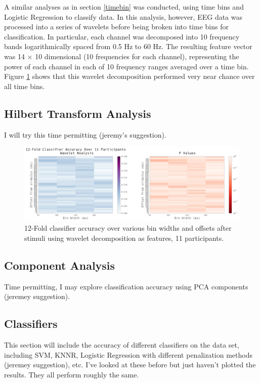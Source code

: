 \documentclass[11pt]{report}
\begin{document}
A similar analyses as in section \ref{timebin} was conducted, using time bins and Logistic Regression to classify data.  In this analysis, however, EEG data was processed into a series of wavelets before being broken into time bins for classification.  In particular, each channel was decomposed into 10 frequency bands logarithmically spaced from 0.5 Hz to 60 Hz.  The resulting feature vector was 14 $\times$ 10 dimensional (10 frequencies for each channel), representing the power of each channel in each of 10 frequency ranges averaged over a time bin.  Figure \ref{wavelet_gridsearch} shows that this wavelet decomposition performed very near chance over all time bins.

\subsection{Hilbert Transform Analysis}  

I will try this time permitting (jeremy's suggestion).

\begin{figure}[t]
\centerline{
\includegraphics[width=7in]{wavelet_gridsearch.png}
}
\caption{12-Fold classifier accuracy over various bin widths and offsets after stimuli using wavelet decomposition as features, 11 participants.\label{wavelet_gridsearch}}
\end{figure}


\subsection{Component Analysis}

Time permitting, I may explore classification accuracy using PCA components (jeremey suggestion).

\subsection{Classifiers}

This section will include the accuracy of different classifiers on the data set, including SVM, KNNR, Logistic Regression with different penalization methods (jeremey suggestion), etc.  I've looked at these before but just haven't plotted the results.  They all perform roughly the same.
\end{document}
